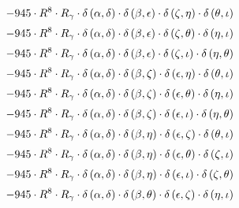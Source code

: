 \begin{subequations}
\begin{gather}
 \\[0.2em] \notag 		 - 945 \cdot R^{8} \cdot R_{\gamma{}} \cdot \delta{}\left(\alpha{}, \delta{}\right) \cdot \delta{}\left(\beta{}, \epsilon{}\right) \cdot \delta{}\left(\zeta{}, \eta{}\right) \cdot \delta{}\left(\theta{}, \iota{}\right) 
 \\[0.2em] \notag 		 - 945 \cdot R^{8} \cdot R_{\gamma{}} \cdot \delta{}\left(\alpha{}, \delta{}\right) \cdot \delta{}\left(\beta{}, \epsilon{}\right) \cdot \delta{}\left(\zeta{}, \theta{}\right) \cdot \delta{}\left(\eta{}, \iota{}\right) 
 \\[0.2em] \notag 		 - 945 \cdot R^{8} \cdot R_{\gamma{}} \cdot \delta{}\left(\alpha{}, \delta{}\right) \cdot \delta{}\left(\beta{}, \epsilon{}\right) \cdot \delta{}\left(\zeta{}, \iota{}\right) \cdot \delta{}\left(\eta{}, \theta{}\right) 
 \\[0.2em] \notag 		 - 945 \cdot R^{8} \cdot R_{\gamma{}} \cdot \delta{}\left(\alpha{}, \delta{}\right) \cdot \delta{}\left(\beta{}, \zeta{}\right) \cdot \delta{}\left(\epsilon{}, \eta{}\right) \cdot \delta{}\left(\theta{}, \iota{}\right) 
 \\[0.2em] \notag 		 - 945 \cdot R^{8} \cdot R_{\gamma{}} \cdot \delta{}\left(\alpha{}, \delta{}\right) \cdot \delta{}\left(\beta{}, \zeta{}\right) \cdot \delta{}\left(\epsilon{}, \theta{}\right) \cdot \delta{}\left(\eta{}, \iota{}\right) 
 \\[0.2em] \notag 		 - 945 \cdot R^{8} \cdot R_{\gamma{}} \cdot \delta{}\left(\alpha{}, \delta{}\right) \cdot \delta{}\left(\beta{}, \zeta{}\right) \cdot \delta{}\left(\epsilon{}, \iota{}\right) \cdot \delta{}\left(\eta{}, \theta{}\right) 
 \\[0.2em] \notag 		 - 945 \cdot R^{8} \cdot R_{\gamma{}} \cdot \delta{}\left(\alpha{}, \delta{}\right) \cdot \delta{}\left(\beta{}, \eta{}\right) \cdot \delta{}\left(\epsilon{}, \zeta{}\right) \cdot \delta{}\left(\theta{}, \iota{}\right) 
 \\[0.2em] \notag 		 - 945 \cdot R^{8} \cdot R_{\gamma{}} \cdot \delta{}\left(\alpha{}, \delta{}\right) \cdot \delta{}\left(\beta{}, \eta{}\right) \cdot \delta{}\left(\epsilon{}, \theta{}\right) \cdot \delta{}\left(\zeta{}, \iota{}\right) 
 \\[0.2em] \notag 		 - 945 \cdot R^{8} \cdot R_{\gamma{}} \cdot \delta{}\left(\alpha{}, \delta{}\right) \cdot \delta{}\left(\beta{}, \eta{}\right) \cdot \delta{}\left(\epsilon{}, \iota{}\right) \cdot \delta{}\left(\zeta{}, \theta{}\right) 
 \\[0.2em] \notag 		 - 945 \cdot R^{8} \cdot R_{\gamma{}} \cdot \delta{}\left(\alpha{}, \delta{}\right) \cdot \delta{}\left(\beta{}, \theta{}\right) \cdot \delta{}\left(\epsilon{}, \zeta{}\right) \cdot \delta{}\left(\eta{}, \iota{}\right) 

\end{gather}
\end{subequations}
